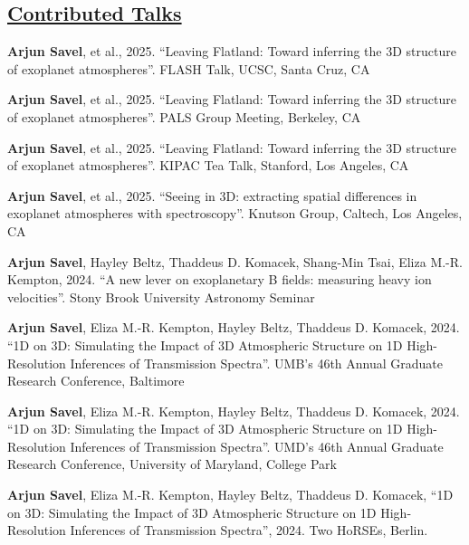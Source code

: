 \documentclass[letterpaper,10.5pt]{article}
\newcommand{\shortershorterSection}[1]{\vspace{-10pt}\subsection{#1}}
\begin{document}
\shortershorterSection{\underline{Contributed Talks}}

\small
  \begin{list}{}{\cvlist}

   \item[{\color{numcolor}\scriptsize18}] \textbf{Arjun Savel}, et al., 2025. ``Leaving Flatland: Toward inferring the 3D structure of exoplanet atmospheres''. FLASH Talk, UCSC, Santa Cruz, CA

   \item[{\color{numcolor}\scriptsize17}] \textbf{Arjun Savel}, et al., 2025. ``Leaving Flatland: Toward inferring the 3D structure of exoplanet atmospheres''. PALS Group Meeting, Berkeley, CA 


   \item[{\color{numcolor}\scriptsize16}] \textbf{Arjun Savel}, et al., 2025. ``Leaving Flatland: Toward inferring the 3D structure of exoplanet atmospheres''. KIPAC Tea Talk, Stanford, Los Angeles, CA 

      \item[{\color{numcolor}\scriptsize15}] \textbf{Arjun Savel}, et al., 2025. ``Seeing in 3D: extracting spatial differences in exoplanet atmospheres
with spectroscopy''. Knutson Group, Caltech, Los Angeles, CA

    \item[{\color{numcolor}\scriptsize14}] \textbf{Arjun Savel}, Hayley Beltz, Thaddeus D. Komacek, Shang-Min Tsai, Eliza M.-R. Kempton, 2024. ``A new lever on exoplanetary B fields: measuring heavy ion velocities''. Stony Brook University Astronomy Seminar 

  \item[{\color{numcolor}\scriptsize13}] \textbf{Arjun Savel}, Eliza M.-R. Kempton, Hayley Beltz, Thaddeus D. Komacek, 2024. ``1D on 3D: Simulating the Impact of 3D Atmospheric Structure on 1D High-Resolution Inferences of Transmission Spectra''. UMB's 46th Annual Graduate Research Conference, Baltimore 
  
    \item[{\color{numcolor}\scriptsize12}] \textbf{Arjun Savel},  Eliza M.-R. Kempton, Hayley Beltz, Thaddeus D. Komacek, 2024. ``1D on 3D: Simulating the Impact of 3D Atmospheric Structure on 1D High-Resolution Inferences of Transmission Spectra''. UMD's 46th Annual Graduate Research Conference, University of Maryland, College Park 

    \item[{\color{numcolor}\scriptsize11}] \textbf{Arjun Savel},  Eliza M.-R. Kempton, Hayley Beltz, Thaddeus D. Komacek, ``1D on 3D: Simulating the Impact of 3D Atmospheric Structure on 1D High-Resolution Inferences of Transmission Spectra'', 2024. Two HoRSEs, Berlin.


\end{list}
\end{document}

